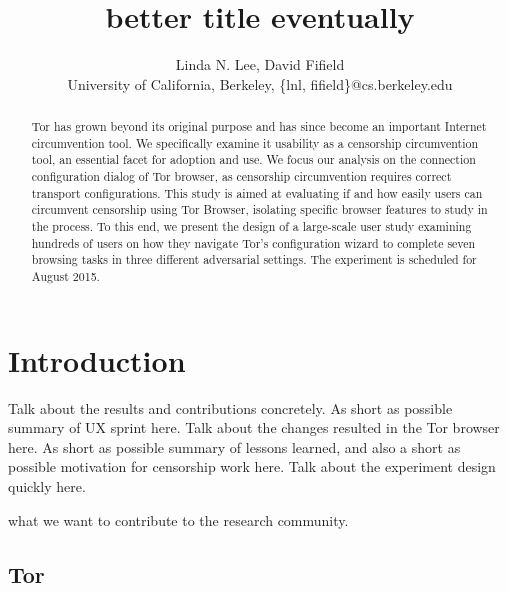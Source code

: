 \documentclass[letterpaper,twocolumn,11pt]{article}
\begin{document}
\title{better title eventually}
\author{Linda N. Lee, David Fifield\\
University of California, Berkeley, \{lnl, fifield\}@cs.berkeley.edu
}
\maketitle

\begin{abstract}
\indent \indent Tor has grown beyond its original purpose and has  since become an important 
Internet circumvention tool. We specifically examine it usability as a censorship circumvention tool, 
an essential facet for adoption and use.  We focus our analysis on the connection configuration dialog of 
Tor browser, as censorship circumvention requires correct transport configurations. 
This study is aimed at evaluating if and how easily users can circumvent censorship using Tor Browser,
isolating specific browser features to study in the process.  To this end, we present the design of
 a large-scale user study examining hundreds of users  on how they navigate Tor's configuration wizard to complete seven browsing tasks in three different adversarial settings. The experiment is scheduled for August 2015.
\end{abstract}

\section{Introduction} %
\indent \indent Talk about the results and contributions concretely.
As short as possible summary of UX sprint here. %
Talk about the changes resulted in the Tor browser here.
As short as possible summary of lessons learned, 
and also a short as possible motivation for censorship work here. %
Talk about the experiment design quickly here. 

{\color {red} what we want to contribute to the research community.}

\subsection{Tor} 
\end{document}
